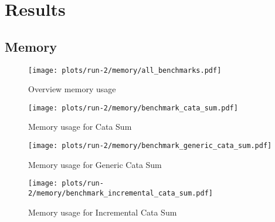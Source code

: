 \section{Results}

\subsection{Memory}
\begin{figure}[H]
    \centering
    \texttt{[image: plots/run-2/memory/all\_benchmarks.pdf]}
    \caption{Overview memory usage}
    \label{fig-bytes-all-overview}
\end{figure}

\begin{figure}[H]
    \centering
    \texttt{[image: plots/run-2/memory/benchmark\_cata\_sum.pdf]}
    \caption{Memory usage for Cata Sum}
    \label{fig-bytes-all-cata-sum}
\end{figure}

\begin{figure}[H]
    \centering
    \texttt{[image: plots/run-2/memory/benchmark\_generic\_cata\_sum.pdf]}
    \caption{Memory usage for Generic Cata Sum}
    \label{fig-bytes-all-gen-cata-sum}
\end{figure}

\begin{figure}[H]
    \centering
    \texttt{[image: plots/run-2/memory/benchmark\_incremental\_cata\_sum.pdf]}
    \caption{Memory usage for Incremental Cata Sum}
    \label{fig-bytes-all-inc-cata-sum}
\end{figure}